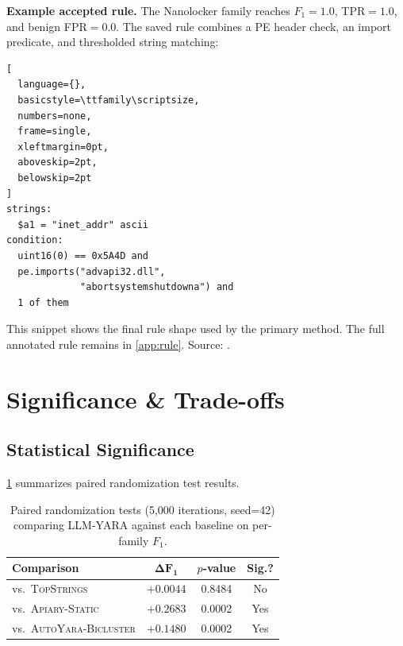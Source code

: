 \documentclass[10pt,twocolumn]{article}
\newcommand{\sysname}{\textsc{LLM-YARA}\xspace}
\newcommand{\topstrings}{\textsc{TopStrings}\xspace}
\newcommand{\apiary}{\textsc{Apiary-Static}\xspace}
\newcommand{\autoyara}{\textsc{AutoYara-Bicluster}\xspace}
\begin{document}
\smallskip
\noindent\textbf{Example accepted rule.}  The Nanolocker family reaches
$F_1=1.0$, TPR$=1.0$, and benign FPR$=0.0$.  The saved rule combines a
PE header check, an import predicate, and thresholded string matching:

\begin{center}
\begin{minipage}{0.9\columnwidth}
\begin{lstlisting}[
  language={},
  basicstyle=\ttfamily\scriptsize,
  numbers=none,
  frame=single,
  xleftmargin=0pt,
  aboveskip=2pt,
  belowskip=2pt
]
strings:
  $a1 = "inet_addr" ascii
condition:
  uint16(0) == 0x5A4D and
  pe.imports("advapi32.dll",
             "abortsystemshutdowna") and
  1 of them
\end{lstlisting}
\end{minipage}
\end{center}

This snippet shows the final rule shape used by the primary method.
The full annotated rule remains in
\cref{app:rule}.  Source:
.

\section{Significance \& Trade-offs}
\label{sec:significance}

\subsection{Statistical Significance}

\cref{tab:sig} summarizes paired randomization test results.

\begin{table}[H]
\centering
\caption{Paired randomization tests (5,000 iterations, seed=42)
  comparing \sysname against each baseline on per-family $F_1$.}
\label{tab:sig}
\small
\begin{tabular}{@{}lccc@{}}
\toprule
\textbf{Comparison} & $\boldsymbol{\Delta F_1}$ & \textbf{$p$-value} & \textbf{Sig.?} \\
\midrule
vs.\ \topstrings & $+0.0044$ & 0.8484 & No  \\
vs.\ \apiary     & $+0.2683$ & 0.0002 & Yes \\
vs.\ \autoyara   & $+0.1480$ & 0.0002 & Yes \\
\bottomrule
\end{tabular}
\end{table}
\end{document}
